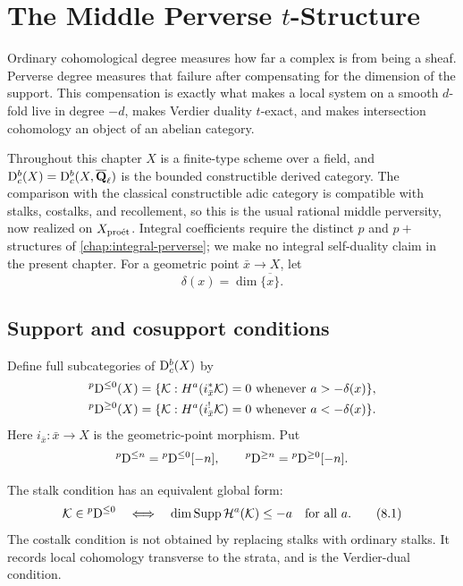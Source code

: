 \chapter{The Middle Perverse \texorpdfstring{\(t\)}{t}-Structure}
\label{chap:perverse-t-structure}

Ordinary cohomological degree measures how far a complex is from being a
sheaf.  Perverse degree measures that failure after compensating for the
dimension of the support.  This compensation is exactly what makes a local
system on a smooth \(d\)-fold live in degree \(-d\), makes Verdier duality
\(t\)-exact, and makes intersection cohomology an object of an abelian
category.

Throughout this chapter \(X\) is a finite-type scheme over a field, and
\(\mathrm D^b_c(X)=\mathrm D^b_c(X,\overline{\mathbf Q}_\ell)\) is the bounded constructible derived category.  The
comparison with the classical constructible adic category is compatible with
stalks, costalks, and recollement, so this is the usual rational middle
perversity, now realized on \(X_{\mathrm{pro\acute et}}\).  Integral coefficients require the
distinct \(p\) and \(p+\) structures of \cref{chap:integral-perverse}; we make
no integral self-duality claim in the present chapter.  For a geometric point
\(\bar x\to X\), let
\[
  \delta(x)=\dim\overline{\{x\}}.
\]

\section{Support and cosupport conditions}

\begin{definition}
\label{def:middle-perversity}
Define full subcategories of \(\mathrm D^b_c(X)\) by
\begin{align*}
 {}^p\mathrm D^{\leq0}(X)
 &=\{\mathcal K:H^a(i_{\bar x}^*\mathcal K)=0
       \text{ whenever }a>-\delta(x)\},\\
 {}^p\mathrm D^{\geq0}(X)
 &=\{\mathcal K:H^a(i_{\bar x}^!\mathcal K)=0
       \text{ whenever }a<-\delta(x)\}.
\end{align*}
Here \(i_{\bar x}:\bar x\to X\) is the geometric-point morphism.  Put
\[
 {}^p\mathrm D^{\leq n}={}^p\mathrm D^{\leq0}[-n],\qquad
 {}^p\mathrm D^{\geq n}={}^p\mathrm D^{\geq0}[-n].
\]
\end{definition}

The stalk condition has an equivalent global form:
\[
 \mathcal K\in{}^p\mathrm D^{\leq0}
 \quad\Longleftrightarrow\quad
 \dim\operatorname{Supp}\mathcal H^a(\mathcal K)\leq-a\quad\text{for all }a.
\tag{8.1}\label{eq:perverse-support}
\]
The costalk condition is not obtained by replacing stalks with ordinary
stalks.  It records local cohomology transverse to the strata, and is the
Verdier-dual condition.

